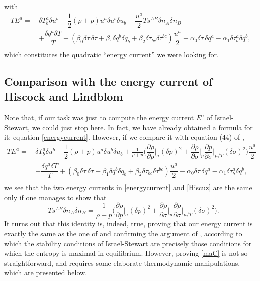 \documentclass[a4paper, amsfonts, amssymb, amsmath, reprint, showkeys, nofootinbib, twoside, onecolumn,notitlepage]{revtex4-1}
\begin{document}
with
\begin{equation}\label{energycurrent}
\begin{split}
TE^a = \, & \delta T^a_b \delta u^b - \dfrac{1}{2} (\rho +p) u^a \delta u^b \delta u_b - \dfrac{u^a}{2} T s^{AB} \delta n_A \delta n_B  \\
&   +  \dfrac{\delta q^a \delta T}{T} + (\beta_0 \delta\tau \, \delta \tau +\beta_1 \delta q^b \delta q_b +\beta_2 \delta \tau_{bc} \delta \tau^{bc}) \dfrac{u^a}{2} - \alpha_0 \delta \tau \, \delta q^a - \alpha_1 \delta \tau^a_b \delta  q^b  ,  \\
\end{split}
\end{equation}
which constitutes the quadratic ``energy current'' we were looking for.

\subsection{Comparison with the energy current of Hiscock and Lindblom}

Note that, if our task was just to compute the energy current $E^a$ of Israel-Stewart, we could just stop here. In fact, we have already obtained a formula for it: equation \eqref{energycurrent}. However, if we compare it with equation (44) of \citet{Hishcock1983}, 
\begin{equation}\label{Hiscuz}
\begin{split}
TE^a = \, & \delta T^a_b \delta u^b - \dfrac{1}{2} (\rho +p) u^a \delta u^b \delta u_b  + \frac{1}{\rho + p} \bigg( \dfrac{\partial \rho}{\partial p} \bigg|_\sigma (\delta p)^2  + \dfrac{\partial \rho}{\partial \sigma}\bigg|_{p} \dfrac{\partial p}{\partial \sigma} \bigg|_{\mu/T} (\delta \sigma)^2 \bigg) \dfrac{u^a}{2} \\
&   +  \dfrac{\delta q^a \delta T}{T} + (\beta_0 \delta\tau \, \delta \tau +\beta_1 \delta q^b \delta q_b +\beta_2 \delta \tau_{bc} \delta \tau^{bc}) \dfrac{u^a}{2} - \alpha_0 \delta \tau \, \delta q^a - \alpha_1 \delta \tau^a_b \delta  q^b  ,  \\
\end{split}
\end{equation}
we see that the two energy currents in \eqref{energycurrent} and \eqref{Hiscuz} are the same only if one manages to show that
\begin{equation}\label{maC}
 -Ts^{AB} \delta n_A \delta n_B = \frac{1}{\rho + p} \bigg( \dfrac{\partial \rho}{\partial p} \bigg|_\sigma (\delta p)^2  + \dfrac{\partial \rho}{\partial \sigma}\bigg|_{p} \dfrac{\partial p}{\partial \sigma} \bigg|_{\mu/T} (\delta \sigma)^2 \bigg)  .
\end{equation}
It turns out that this identity is, indeed, true, proving that our energy current is exactly the same as the one of \citet{Hishcock1983} and confirming the argument of \citet{GavassinoLyapunov_2020}, according to which the stability conditions of Israel-Stewart are precisely those conditions for which the entropy is maximal in equilibrium. However, proving \eqref{maC} is not so straightforward, and requires some elaborate thermodynamic manipulations, which are presented below. 
\end{document}
